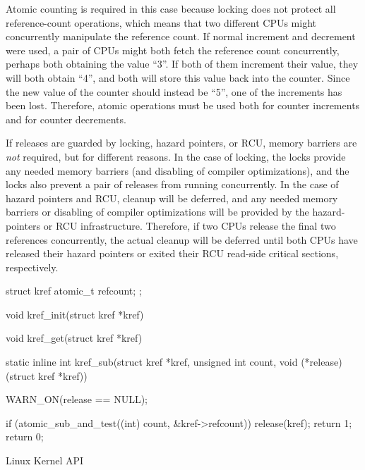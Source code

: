Atomic counting is required in this case because locking does not protect
all reference-count operations, which means that two different CPUs
might concurrently manipulate the reference count.
If normal increment and decrement were used, a pair of CPUs might both
fetch the reference count concurrently, perhaps both obtaining
the value ``3''.
If both of them increment their value, they will both obtain ``4'',
and both will store this value back into the counter.
Since the new value of the counter should instead be ``5'', one
of the increments has been lost.
Therefore, atomic operations must be used both for counter increments
and for counter decrements.

If releases are guarded by locking, hazard pointers, or RCU,
memory barriers are \emph{not} required, but for different reasons.
In the case of locking, the locks provide any needed memory barriers
(and disabling of compiler optimizations), and the locks also
prevent a pair of releases from running concurrently.
In the case of hazard pointers and RCU, cleanup will be deferred,
and any needed memory barriers or disabling of compiler optimizations
will be provided by the hazard-pointers or RCU infrastructure.
Therefore, if two CPUs release the final two references concurrently, the
actual cleanup will be deferred until both CPUs have released their hazard
pointers or exited their RCU read-side critical sections, respectively.

\QuickQuizEnd

\begin{listing}
\begin{fcvlabel}
\begin{VerbatimL}[commandchars=\\\[\]]
struct kref {						\lnlbl[kref:b]
	atomic_t refcount;
};							\lnlbl[kref:e]

void kref_init(struct kref *kref)										\lnlbl[init:e]

void kref_get(struct kref *kref)										\lnlbl[get:e]

static inline int					\lnlbl[sub:b]
kref_sub(struct kref *kref, unsigned int count,
         void (*release)(struct kref *kref))
{
	WARN_ON(release == NULL);

	if (atomic_sub_and_test((int) count,		\lnlbl[check]
	                        &kref->refcount)) {
		release(kref);				\lnlbl[rel]
		return 1;				\lnlbl[ret:1]
	}
	return 0;
}							\lnlbl[sub:e]
\end{VerbatimL}
\end{fcvlabel}
\caption{Linux Kernel  API}
\label{lst:together:Linux Kernel kref API}
\end{listing}

